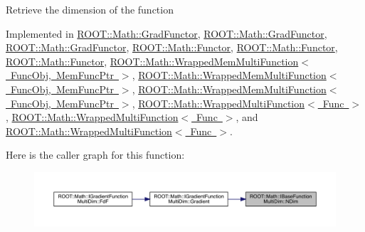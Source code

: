 Retrieve the dimension of the function 

Implemented in \mbox{\hyperlink{classROOT_1_1Math_1_1GradFunctor_a7ff4ed4ad6f7c17d74403a443990f069}{R\+O\+O\+T\+::\+Math\+::\+Grad\+Functor}}, \mbox{\hyperlink{classROOT_1_1Math_1_1GradFunctor_a7ff4ed4ad6f7c17d74403a443990f069}{R\+O\+O\+T\+::\+Math\+::\+Grad\+Functor}}, \mbox{\hyperlink{classROOT_1_1Math_1_1GradFunctor_a7ff4ed4ad6f7c17d74403a443990f069}{R\+O\+O\+T\+::\+Math\+::\+Grad\+Functor}}, \mbox{\hyperlink{classROOT_1_1Math_1_1Functor_a2544e2ed3c6a0420084c7b08eb3c3130}{R\+O\+O\+T\+::\+Math\+::\+Functor}}, \mbox{\hyperlink{classROOT_1_1Math_1_1Functor_a2544e2ed3c6a0420084c7b08eb3c3130}{R\+O\+O\+T\+::\+Math\+::\+Functor}}, \mbox{\hyperlink{classROOT_1_1Math_1_1Functor_a2544e2ed3c6a0420084c7b08eb3c3130}{R\+O\+O\+T\+::\+Math\+::\+Functor}}, \mbox{\hyperlink{classROOT_1_1Math_1_1WrappedMemMultiFunction_ae9aaf3de1f2e1e6e1c1310fccdb06009}{R\+O\+O\+T\+::\+Math\+::\+Wrapped\+Mem\+Multi\+Function$<$ Func\+Obj, Mem\+Func\+Ptr $>$}}, \mbox{\hyperlink{classROOT_1_1Math_1_1WrappedMemMultiFunction_ae9aaf3de1f2e1e6e1c1310fccdb06009}{R\+O\+O\+T\+::\+Math\+::\+Wrapped\+Mem\+Multi\+Function$<$ Func\+Obj, Mem\+Func\+Ptr $>$}}, \mbox{\hyperlink{classROOT_1_1Math_1_1WrappedMemMultiFunction_ae9aaf3de1f2e1e6e1c1310fccdb06009}{R\+O\+O\+T\+::\+Math\+::\+Wrapped\+Mem\+Multi\+Function$<$ Func\+Obj, Mem\+Func\+Ptr $>$}}, \mbox{\hyperlink{classROOT_1_1Math_1_1WrappedMultiFunction_a99de9f7a6e26b03b1cdcf35d8c62d761}{R\+O\+O\+T\+::\+Math\+::\+Wrapped\+Multi\+Function$<$ Func $>$}}, \mbox{\hyperlink{classROOT_1_1Math_1_1WrappedMultiFunction_a99de9f7a6e26b03b1cdcf35d8c62d761}{R\+O\+O\+T\+::\+Math\+::\+Wrapped\+Multi\+Function$<$ Func $>$}}, and \mbox{\hyperlink{classROOT_1_1Math_1_1WrappedMultiFunction_a99de9f7a6e26b03b1cdcf35d8c62d761}{R\+O\+O\+T\+::\+Math\+::\+Wrapped\+Multi\+Function$<$ Func $>$}}.

Here is the caller graph for this function\+:
\nopagebreak
\begin{figure}[H]
\begin{center}
\leavevmode
\includegraphics[width=350pt]{d0/d87/classROOT_1_1Math_1_1IBaseFunctionMultiDim_a16f37dc7a6d00c75ddeda0697741315d_icgraph}
\end{center}
\end{figure}
\mbox{\label{classROOT_1_1Math_1_1IBaseFunctionMultiDim_a16f37dc7a6d00c75ddeda0697741315d}} 
